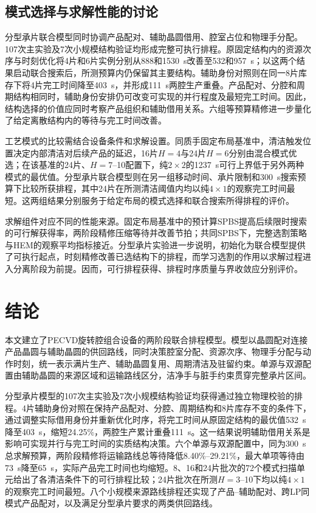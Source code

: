 \documentclass[final,5p,times,twocolumn]{elsarticle}
\begin{document}
\subsection{模式选择与求解性能的讨论}

分型承片联合模型同时协调产品配对、辅助晶圆借用、腔室占位和物理手分配。107次主实验及7次小规模结构验证均形成完整可执行排程。原固定结构内的资源次序与时刻优化将4片和6片实例分别从888和1530~s改善至532和957~s；以这两个结果启动联合搜索后，所测预算内仍保留其主要结构。辅助身份对照则在同一8片库存下将4片完工时间降至403~s，并形成111~s两腔生产重叠。产品配对、分腔和周期结构相同时，辅助身份安排仍可改变可实现的并行程度及最短完工时间。因此，结构选择的价值应同时考察产品组织和辅助借用关系。六组等预算精修进一步量化了给定离散结构内的等待与完工时间改善。

工艺模式的比较需结合设备条件和求解设置。同质手固定布局基准中，清洁触发位置决定内部清洁对后续产品的延迟，16片$H=4$与24片$H=6$分别由混合模式优选；在该基准的24片、$H=7$--10配置下，纯$2\times2$的1237~s可行上界低于另外两种模式的最优值。分型承片联合模型则在另一组移动时间、承片限制和300~s搜索预算下比较所获排程，其中24片在所测清洁阈值内均以纯$4\times1$的观察完工时间最短。这两组结果分别服务于给定布局的模式选择和联合搜索所得排程的评价。

求解组件对应不同的性能来源。固定布局基准中的预计算SPBS提高后续限时搜索的可行解获得率，两阶段精修压缩等待并改善节拍；共同SPBS下，完整选割策略与HEM的观察平均指标接近。分型承片实验进一步说明，初始化为联合模型提供了可执行起点，时刻精修改善已选结构下的排程，而学习选割的作用以求解过程进入分离阶段为前提。因而，可行排程获得、排程时序质量与界收敛应分别评价。

\FloatBarrier

\section{结论}

本文建立了PECVD旋转腔组合设备的两阶段联合排程模型。模型以晶圆配对连接产品晶圆与辅助晶圆的供回路线，同时决策腔室分配、资源次序、物理手分配与动作时刻，统一表示满片生产、辅助晶圆复用、周期清洁及驻留约束。单源与双源配置由辅助晶圆的来源区域和运输路线区分，洁净手与脏手约束贯穿完整承片区间。

分型承片模型的107次主实验及7次小规模结构验证均获得通过独立物理校验的排程。4片辅助身份对照在保持产品配对、分腔、周期结构和8片库存不变的条件下，通过调整实际借用身份并重新优化时序，将完工时间从原固定结构的最优值532~s降至403~s，缩短24.25\%，两腔生产累计重叠111~s。这一结果说明辅助借用关系是影响可实现并行与完工时间的实质结构决策。六个单源与双源配置中，同为300~s总求解预算，两阶段精修将运输路线总等待降低8.40\%--29.21\%，最大单项等待由73~s降至65~s，实际产品完工时间也均缩短。8、16和24片批次的72个模式扫描单元给出了各清洁条件下的可行排程比较；24片批次在所测$H=3$--10下均以纯$4\times1$的观察完工时间最短。八个小规模来源路线排程还实现了产品--辅助配对、跨LP同模式产品配对，以及满足分型承片要求的两类供回路线。
\end{document}
